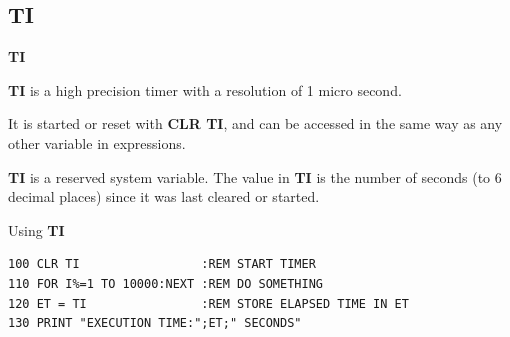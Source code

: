 
\newpage
\subsection{TI}
\begin{description}[leftmargin=2cm,style=nextline]
\item [Format:] {\bf TI}
\item [Usage:]  {\bf TI} is a high precision timer with
                a resolution of 1 micro second.

                It is started or reset with
                {\bf CLR TI}, and can be accessed in the same way as any
                other variable in expressions.
\item [Remarks:] {\bf TI} is a reserved system variable. The value in {\bf TI}
                 is the number of seconds (to 6 decimal places) since it was last cleared or started.

\item [Example:] Using {\bf TI}
\begin{tcolorbox}[colback=black,coltext=white]
\verbatimfont{\codefont}
\begin{verbatim}
100 CLR TI                 :REM START TIMER
110 FOR I%=1 TO 10000:NEXT :REM DO SOMETHING
120 ET = TI                :REM STORE ELAPSED TIME IN ET
130 PRINT "EXECUTION TIME:";ET;" SECONDS"
\end{verbatim}
\end{tcolorbox}
\end{description}


\newpage
